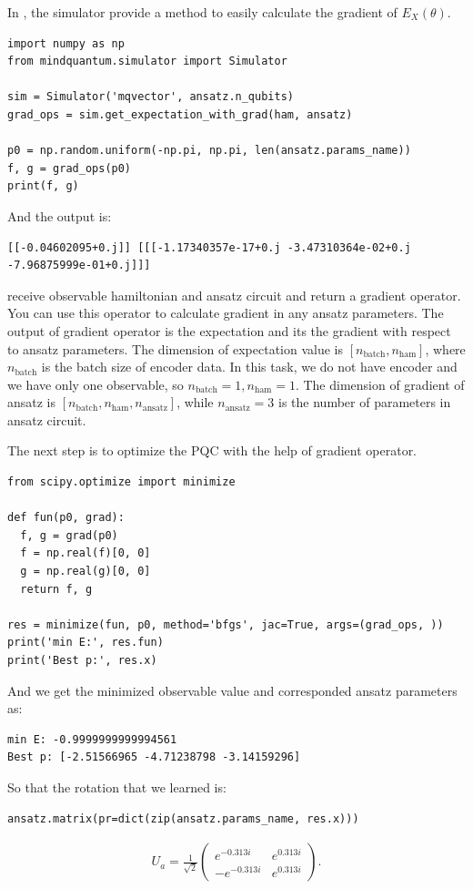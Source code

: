 In \MindQuantum, the simulator provide a method \getexpectationwithgrad to easily calculate the gradient of $E_X(\theta)$.

\begin{lstlisting}
import numpy as np
from mindquantum.simulator import Simulator

sim = Simulator('mqvector', ansatz.n_qubits)
grad_ops = sim.get_expectation_with_grad(ham, ansatz)

p0 = np.random.uniform(-np.pi, np.pi, len(ansatz.params_name))
f, g = grad_ops(p0)
print(f, g)
\end{lstlisting}
And the output is:
\begin{lstlisting}
[[-0.04602095+0.j]] [[[-1.17340357e-17+0.j -3.47310364e-02+0.j -7.96875999e-01+0.j]]]
\end{lstlisting}

\getexpectationwithgrad receive observable hamiltonian and ansatz circuit and return a gradient operator. You can use this operator to calculate gradient in any ansatz parameters. The output of gradient operator is the expectation and its the gradient with respect to ansatz parameters. The dimension of expectation value is $[n_\text{batch}, n_\text{ham}]$, where $n_\text{batch}$ is the batch size of encoder data. In this task, we do not have encoder and we have only one observable, so $n_\text{batch}=1, n_\text{ham}=1$. The dimension of gradient of ansatz is $[n_\text{batch}, n_\text{ham}, n_\text{ansatz}]$, while $n_\text{ansatz} = 3$ is the number of parameters in ansatz circuit.

The next step is to optimize the PQC with the help of gradient operator.
\begin{lstlisting}
from scipy.optimize import minimize

def fun(p0, grad):
  f, g = grad(p0)
  f = np.real(f)[0, 0]
  g = np.real(g)[0, 0]
  return f, g

res = minimize(fun, p0, method='bfgs', jac=True, args=(grad_ops, ))
print('min E:', res.fun)
print('Best p:', res.x)
\end{lstlisting}
And we get the minimized observable value and corresponded ansatz parameters as:
\begin{lstlisting}
min E: -0.9999999999994561
Best p: [-2.51566965 -4.71238798 -3.14159296]
\end{lstlisting}
So that the rotation that we learned is:
\begin{lstlisting}
ansatz.matrix(pr=dict(zip(ansatz.params_name, res.x)))
\end{lstlisting}
\begin{align*}
  U_a=\frac{1}{\sqrt{2}}\begin{pmatrix}
    e^{-0.313i}  & e^{0.313i} \\
    -e^{-0.313i} & e^{0.313i}
  \end{pmatrix}.
\end{align*}

